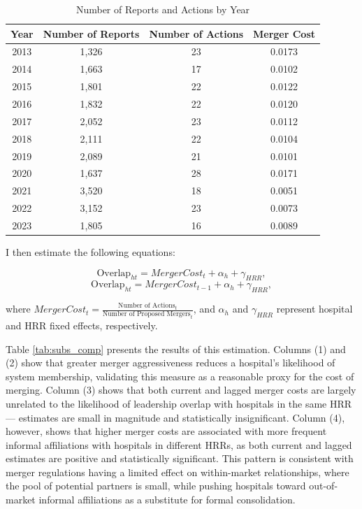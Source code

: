 \documentclass[12pt]{article}
\begin{document}
\begin{table}[htbp]
    \centering
    \caption{Number of Reports and Actions by Year}
    \label{tab:reports_actions}
    \begin{tabular}{cccc}
        \hline
        \textbf{Year} & \textbf{Number of Reports} & \textbf{Number of Actions} & \textbf{Merger Cost} \\
        \hline
        2013 & 1,326 & 23 & 0.0173 \\
        2014 & 1,663 & 17 & 0.0102 \\
        2015 & 1,801 & 22 & 0.0122 \\
        2016 & 1,832 & 22 & 0.0120 \\
        2017 & 2,052 & 23 & 0.0112 \\
        2018 & 2,111 & 22 & 0.0104 \\
        2019 & 2,089 & 21 & 0.0101 \\
        2020 & 1,637 & 28 & 0.0171 \\
        2021 & 3,520 & 18 & 0.0051 \\
        2022 & 3,152 & 23 & 0.0073 \\
        2023 & 1,805 & 16 & 0.0089 \\
        \hline
    \end{tabular}
\end{table}
    
    \noindent I then estimate the following equations: 

    $$\text{Overlap}_{ht} = MergerCost_t + \alpha_h + \gamma_{HRR},$$
    $$\text{Overlap}_{ht} = MergerCost_{t-1} + \alpha_h + \gamma_{HRR},$$

    \noindent where $MergerCost_t = \frac{\text{Number of Actions}_t}{\text{Number of Proposed Mergers}_t}$, and $\alpha_h$ and $\gamma_{HRR}$ represent hospital and HRR fixed effects, respectively. 

    Table \ref{tab:subs_comp} presents the results of this estimation. Columns (1) and (2) show that greater merger aggressiveness reduces a hospital's likelihood of system membership, validating this measure as a reasonable proxy for the cost of merging. Column (3) shows that both current and lagged merger costs are largely unrelated to the likelihood of leadership overlap with hospitals in the same HRR — estimates are small in magnitude and statistically insignificant. Column (4), however, shows that higher merger costs are associated with more frequent informal affiliations with hospitals in different HRRs, as both current and lagged estimates are positive and statistically significant. This pattern is consistent with merger regulations having a limited effect on within-market relationships, where the pool of potential partners is small, while pushing hospitals toward out-of-market informal affiliations as a substitute for formal consolidation.
\end{document}
